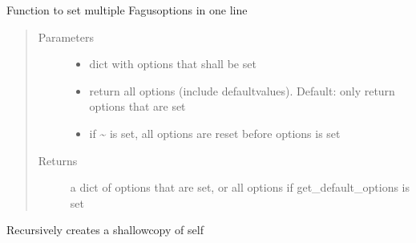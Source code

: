 \documentclass[a4paper,10pt,english]{sphinxmanual}
\begin{document}
\begin{fulllineitems}
\begin{fulllineitems}
\label{\detokenize{fagus.fagus:fagus.fagus.Fagus.options}}
\pysigstartsignatures
{}
\pysigstopsignatures
\sphinxAtStartPar
Function to set multiple Fagus\sphinxhyphen{}options in one line
\begin{quote}\begin{description}
\item[{Parameters}] \leavevmode\begin{itemize}
\item {}
\sphinxAtStartPar
{} \textendash{} dict with options that shall be set

\item {}
\sphinxAtStartPar
{} \textendash{} return all options (include default\sphinxhyphen{}values). Default: only return options that are set

\item {}
\sphinxAtStartPar
{} \textendash{} if \textasciitilde{} is set, all options are reset before options is set

\end{itemize}

\item[{Returns}] \leavevmode
\sphinxAtStartPar
a dict of options that are set, or all options if get\_default\_options is set

\end{description}\end{quote}

\end{fulllineitems}


\begin{fulllineitems}
\label{\detokenize{fagus.fagus:fagus.fagus.Fagus.__copy__}}
\pysigstartsignatures
{}
\pysigstopsignatures
\sphinxAtStartPar
Recursively creates a shallow\sphinxhyphen{}copy of self


\end{fulllineitems}
\end{fulllineitems}
\end{document}
